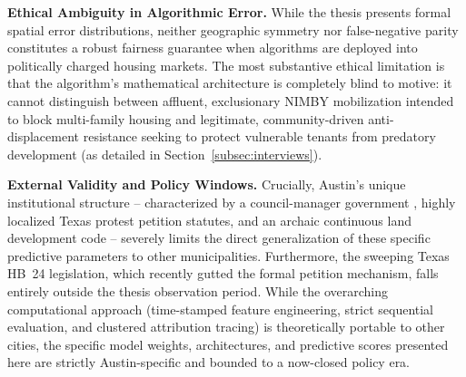 \documentclass[11pt, letterpaper, oneside]{article}
\begin{document}
\textbf{Ethical Ambiguity in Algorithmic Error.} While the thesis presents formal spatial error distributions, neither geographic symmetry nor false-negative parity constitutes a robust fairness guarantee when algorithms are deployed into politically charged housing markets. The most substantive ethical limitation is that the algorithm's mathematical architecture is completely blind to motive: it cannot distinguish between affluent, exclusionary NIMBY mobilization intended to block multi-family housing and legitimate, community-driven anti-displacement resistance seeking to protect vulnerable tenants from predatory development (as detailed in Section~\ref{subsec:interviews}).  

\textbf{External Validity and Policy Windows.} Crucially, Austin's unique institutional structure -- characterized by a council-manager government \cite{cityaustin2010}, highly localized Texas protest petition statutes, and an archaic continuous land development code -- severely limits the direct generalization of these specific predictive parameters to other municipalities. Furthermore, the sweeping Texas HB~24 legislation, which recently gutted the formal petition mechanism, falls entirely outside the thesis observation period. While the overarching computational approach (time-stamped feature engineering, strict sequential evaluation, and clustered attribution tracing) is theoretically portable to other cities, the specific model weights, architectures, and predictive scores presented here are strictly Austin-specific and bounded to a now-closed policy era.
\end{document}
